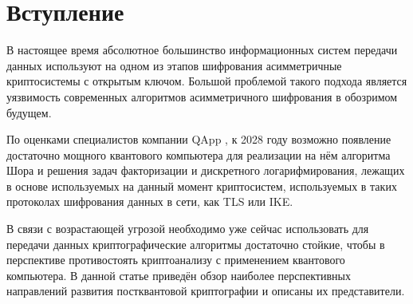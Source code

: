 \section{Вступление}
В настоящее время абсолютное большинство информационных систем передачи данных используют на одном из этапов шифрования асимметричные криптосистемы с открытым ключом. Большой проблемой такого подхода является уязвимость современных алгоритмов асимметричного шифрования в обозримом будущем.

По оценками специалистов компании QApp \cite{quantumthreat}, к 2028 году возможно появление достаточно мощного квантового компьютера для реализации на нём алгоритма Шора \cite{Shor} и решения задач факторизации и дискретного логарифмирования, лежащих в основе используемых на данный момент криптосистем, используемых в таких протоколах шифрования данных в сети, как TLS или IKE.

В связи с возрастающей угрозой необходимо уже сейчас использовать для передачи данных криптографические алгоритмы достаточно стойкие, чтобы в перспективе противостоять криптоанализу с применением квантового компьютера. В данной статье приведён обзор наиболее перспективных направлений развития постквантовой криптографии и описаны их представители.

\clearpage
